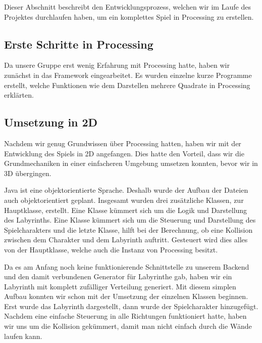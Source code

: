 Dieser Abschnitt beschreibt den Entwicklungsprozess, welchen wir im Laufe des Projektes durchlaufen haben, um ein komplettes Spiel in Processing zu erstellen.

\subsection{Erste Schritte in Processing}\label{subsec:erste-schritte}
Da unsere Gruppe erst wenig Erfahrung mit Processing hatte, haben wir zunächst in das Framework eingearbeitet. Es wurden einzelne kurze Programme erstellt, welche Funktionen wie dem Darstellen mehrere Quadrate in Processing erklärten.

\subsection{Umsetzung in 2D}\label{subsec:umsetzung-in-2D}
Nachdem wir genug Grundwissen über Processing hatten, haben wir mit der Entwicklung des Spiels in 2D angefangen. Dies hatte den Vorteil, dass wir die Grundmechaniken in einer einfacheren Umgebung umsetzen konnten, bevor wir in 3D übergingen.

Java ist eine objektorientierte Sprache. Deshalb wurde der Aufbau der Dateien auch objektorientiert geplant. Insgesamt wurden drei zusätzliche Klassen, zur Hauptklasse, erstellt. Eine Klasse kümmert sich um die Logik und Darstellung des Labyrinths. Eine Klasse kümmert sich um die Steuerung und Darstellung des Spielcharakters und die letzte Klasse, hilft bei der Berechnung, ob eine Kollision zwischen dem Charakter und dem Labyrinth auftritt. Gesteuert wird dies alles von der Hauptklasse, welche auch die Instanz von Processing besitzt.

Da es am Anfang noch keine funktionierende Schnittstelle zu unserem Backend und den damit verbundenen Generator für Labyrinthe gab, haben wir ein Labyrinth mit komplett zufälliger Verteilung generiert.
Mit diesem simplen Aufbau konnten wir schon mit der Umsetzung der einzelnen Klassen beginnen. Erst wurde das Labyrinth dargestellt, dann wurde der Spielcharakter hinzugefügt. Nachdem eine einfache Steuerung in alle Richtungen funktioniert hatte, haben wir uns um die Kollision gekümmert, damit man nicht einfach durch die Wände laufen kann.

